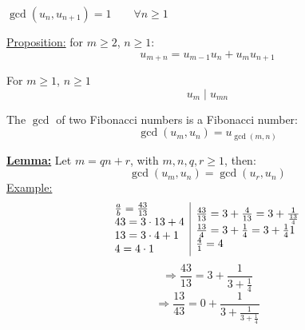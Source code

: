 \documentclass{report}
\begin{document}
\begin{thm} $\gcd(u_n,u_{n+1})=1 \qquad \forall n \geq 1$
\end{thm}
\underline{Proposition:} for $m\geq 2$, $n \geq 1$: \[u_{m+n}=u_{m-1}u_n+u_mu_{n+1}\]
\begin{thm} For $m\geq 1$, $n \geq 1$ \[u_m\mid u_{mn}\]
\end{thm}
\begin{thm} The $\gcd$ of two Fibonacci numbers is a Fibonacci number: \[\gcd(u_m,u_n)=u_{\gcd(m,n)}\]
\end{thm}
\underline{\textbf{Lemma:}} Let $m=qn+r$, with $m,n,q,r \geq 1$, then:
\[\gcd(u_m,u_n)=\gcd(u_r,u_n)\]
\underline{Example:} \[\begin{array}{lcl}
\frac{a}{b} = \frac{43}{13}\\
43=3\cdot 13 +4\\
13=3\cdot 4+1\\
4=4\cdot 1
\end{array}
\vline
\begin{array}{lcl}
\frac{43}{13} = 3+\frac{4}{13}=3+\frac{1}{\frac{13}{4}}\\
\frac{13}{4}=3+\frac{1}{4}=3+\frac{1}{4}{1}\\
\frac{4}{1}=4
\end{array}
\]
\[\Rightarrow \frac{43}{13}=3+\frac{1}{3+\frac{1}{4}}\]
\[\Rightarrow \frac{13}{43}=0+\frac{1}{3+\frac{1}{3+\frac{1}{4}}}\]
\end{document}
